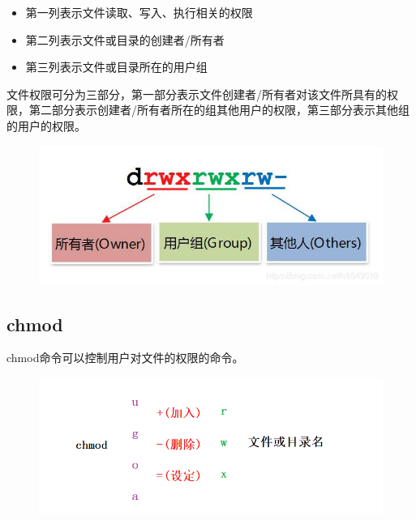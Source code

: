\documentclass[12pt, openany, oneside]{book}
\begin{document}
\begin{itemize}
    \item 第一列表示文件读取、写入、执行相关的权限

    \item 第二列表示文件或目录的创建者/所有者

    \item 第三列表示文件或目录所在的用户组
\end{itemize}

文件权限可分为三部分，第一部分表示文件创建者/所有者对该文件所具有的权限，第二部分表示创建者/所有者所在的组其他用户的权限，第三部分表示其他组的用户的权限。

\begin{table}[H]
    \centering
    \caption{文件权限}
\end{table}

\begin{figure}[H]
    \centering
    \includegraphics[scale=0.7]{img/C5/5-2/2.png}
\end{figure}

\subsection{chmod}

chmod命令可以控制用户对文件的权限的命令。

\begin{figure}[H]
    \centering
    \includegraphics[scale=0.6]{img/C5/5-2/3.png}
\end{figure}
\end{document}
